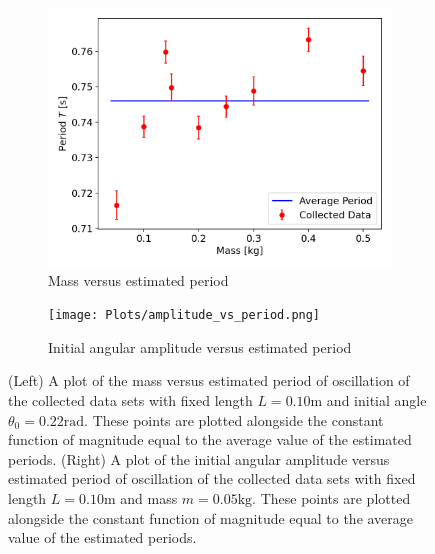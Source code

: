 \begin{figure}[H]
\centering
\begin{subfigure}[t]{0.5\textwidth}
  \centering
  \includegraphics[width=1\textwidth]{Plots/mass_vs_period.png}
  \caption{\small{Mass versus estimated period}}
  \label{mass_period}
\end{subfigure}%
\begin{subfigure}[t]{.5\textwidth}
  \centering
  \texttt{[image: Plots/amplitude\_vs\_period.png]}
  \caption{\small{Initial angular amplitude versus estimated period}}
  \label{amplitude_period}
\end{subfigure}
\caption{\small{(Left) A plot of the mass versus estimated period of oscillation of the collected data sets with fixed length $L = 0.10\text{m}$ and initial angle $\theta_0 = 0.22\text{rad}$. These points are plotted alongside the constant function of magnitude equal to the average value of the estimated periods. (Right) A plot of the initial angular amplitude versus estimated period of oscillation of the collected data sets with fixed length $L = 0.10\text{m}$ and mass $m = 0.05\text{kg}$. These points are plotted alongside the constant function of magnitude equal to the average value of the estimated periods.}}
\end{figure}

